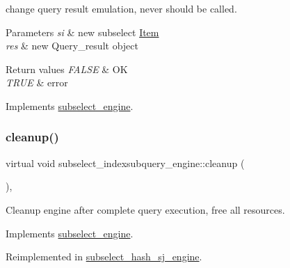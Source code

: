 change query result emulation, never should be called.


\begin{DoxyParams}{Parameters}
{\em si} & new subselect \mbox{\hyperlink{classItem}{Item}} \\
\hline
{\em res} & new Query\+\_\+result object\\
\hline
\end{DoxyParams}

\begin{DoxyRetVals}{Return values}
{\em F\+A\+L\+SE} & OK \\
\hline
{\em T\+R\+UE} & error \\
\hline
\end{DoxyRetVals}


Implements \mbox{\hyperlink{classsubselect__engine}{subselect\+\_\+engine}}.

\mbox{\label{classsubselect__indexsubquery__engine_a185f036d8ce8517de313c2b796b4b060}} 
\subsubsection{\texorpdfstring{cleanup()}{cleanup()}}
{\footnotesize\ttfamily virtual void subselect\+\_\+indexsubquery\+\_\+engine\+::cleanup (\begin{DoxyParamCaption}{ }\end{DoxyParamCaption})\hspace{0.3cm}{\ttfamily [inline]}, {\ttfamily [virtual]}}

Cleanup engine after complete query execution, free all resources. 

Implements \mbox{\hyperlink{classsubselect__engine_a0f0051f24ecc4b20f0e3f8d817293276}{subselect\+\_\+engine}}.



Reimplemented in \mbox{\hyperlink{classsubselect__hash__sj__engine_a2543ad3f7c4cd6ab5e774d6c4eb9ef64}{subselect\+\_\+hash\+\_\+sj\+\_\+engine}}.

\mbox{\label{classsubselect__indexsubquery__engine_ad87696f97f0eef746e6718d3864f2757}} 
